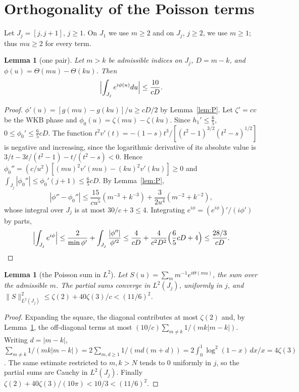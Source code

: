 \documentclass[11pt]{amsart}
\newtheorem{lemma}[proposition]{Lemma}
\theoremstyle{remark}
\numberwithin{equation}{section}
\begin{document}
\section{Orthogonality of the Poisson terms}\label{sec:orth}

Let $J_j=[j,j+1]$, $j\ge1$. On $J_1$ we use $m\ge2$ and on $J_j$, $j\ge2$, we use $m\ge1$; thus $mu\ge2$ for every term.

\begin{lemma}[one pair]\label{lem:pair}
Let $m>k$ be admissible indices on $J_j$, $D=m-k$, and $\phi(u)=\Theta(mu)-\Theta(ku)$. Then
\[
\Bigl|\int_{J_j}e^{i\phi(u)}du\Bigr|\le\frac{10}{cD}.
\]
\end{lemma}
\begin{proof}
$\phi'(u)=[g(mu)-g(ku)]/u\ge cD/2$ by Lemma~\ref{lem:P}. Let $\zeta'=cv$ be the WKB phase and $\phi_0(u)=\zeta(mu)-\zeta(ku)$. Since $h_1'\le\frac65$, $0\le\phi_0'\le\frac65cD$. The function $t^2v'(t)=-(1-s)t^3/[(t^2-1)^{3/2}(t^2-s)^{1/2}]$ is negative and increasing, since the logarithmic derivative of its absolute value is $3/t-3t/(t^2-1)-t/(t^2-s)<0$. Hence $\phi_0''=(c/u^2)[(mu)^2v'(mu)-(ku)^2v'(ku)]\ge0$ and $\int_{J_j}|\phi_0''|\le\phi_0'(j+1)\le\frac65cD$. By Lemma~\ref{lem:P},
\[
|\phi''-\phi_0''|\le\frac{15}{cu^5}(m^{-3}+k^{-3})+\frac3{2u^4}(m^{-2}+k^{-2}),
\]
whose integral over $J_j$ is at most $30/c+3\le4$. Integrating $e^{i\phi}=(e^{i\phi})'/(i\phi')$ by parts,
\[
\Bigl|\int_{J_j}e^{i\phi}\Bigr|\le\frac{2}{\min\phi'}+\int_{J_j}\frac{|\phi''|}{\phi'^2}\le\frac4{cD}+\frac4{c^2D^2}\Bigl(\frac65cD+4\Bigr)\le\frac{28/3}{cD}.
\]
\end{proof}

\begin{lemma}[the Poisson sum in $L^2$]\label{lem:O}
Let $S(u)=\sum_mm^{-1}e^{i\Theta(mu)}$, the sum over the admissible $m$. The partial sums converge in $L^2(J_j)$, uniformly in $j$, and $\|S\|_{L^2(J_j)}^2\le\zeta(2)+40\zeta(3)/c<(11/6)^2$.
\end{lemma}
\begin{proof}
Expanding the square, the diagonal contributes at most $\zeta(2)$ and, by Lemma~\ref{lem:pair}, the off-diagonal terms at most $(10/c)\sum_{m\ne k}1/(mk|m-k|)$. Writing $d=|m-k|$, $\sum_{m\ne k}1/(mk|m-k|)=2\sum_{m,d\ge1}1/(md(m+d))=2\int_0^1\log^2(1-x)\,dx/x=4\zeta(3)$. The same estimate restricted to $m,k>N$ tends to $0$ uniformly in $j$, so the partial sums are Cauchy in $L^2(J_j)$. Finally $\zeta(2)+40\zeta(3)/(10\pi)<10/3<(11/6)^2$.
\end{proof}
\end{document}
